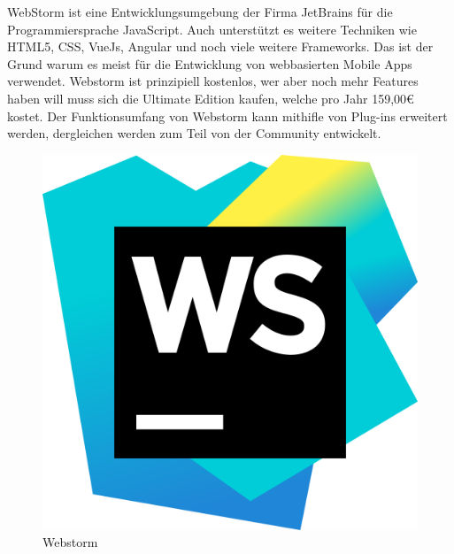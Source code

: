 WebStorm ist eine Entwicklungsumgebung der Firma JetBrains für die Programmiersprache JavaScript. Auch unterstützt es weitere Techniken wie HTML5, CSS, VueJs, Angular und noch viele weitere Frameworks. Das ist der Grund warum es meist für die Entwicklung von webbasierten Mobile Apps verwendet.
Webstorm ist prinzipiell kostenlos, wer aber noch mehr Features haben will muss sich die Ultimate Edition kaufen, welche pro Jahr 159,00€ kostet.
Der Funktionsumfang von Webstorm kann mithifle von Plug-ins erweitert werden, dergleichen werden zum Teil von der Community entwickelt.

\begin{figure}[h!]
    \centering
    \includegraphics[width=0.1\linewidth]{pics/WebStorm_Icon.png}
    \caption{Webstorm}
    \label{fig:enter-label}
\end{figure}

\cite{Webstorm}



